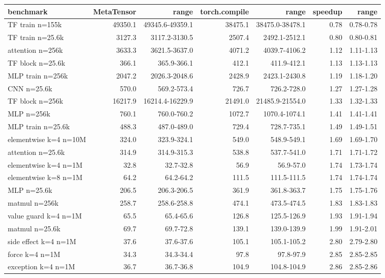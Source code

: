 \begin{tabular}{lrrrrrr}
\toprule
benchmark & MetaTensor & range & torch.compile & range & speedup & range \\
\midrule
TF train n=155k & 49350.1 & 49345.6-49359.1 & 38475.1 & 38475.0-38478.1 & 0.78 & 0.78-0.78 \\
TF train n=25.6k & 3127.3 & 3117.2-3130.5 & 2507.4 & 2492.1-2512.1 & 0.80 & 0.80-0.81 \\
attention n=256k & 3633.3 & 3621.5-3637.0 & 4071.2 & 4039.7-4106.2 & 1.12 & 1.11-1.13 \\
TF block n=25.6k & 366.1 & 365.9-366.1 & 412.1 & 411.9-412.1 & 1.13 & 1.13-1.13 \\
MLP train n=256k & 2047.2 & 2026.3-2048.6 & 2428.9 & 2423.1-2430.8 & 1.19 & 1.18-1.20 \\
CNN n=25.6k & 570.0 & 569.2-573.4 & 726.7 & 726.2-728.0 & 1.27 & 1.27-1.28 \\
TF block n=256k & 16217.9 & 16214.4-16229.9 & 21491.0 & 21485.9-21554.0 & 1.33 & 1.32-1.33 \\
MLP n=256k & 760.1 & 760.0-760.2 & 1072.7 & 1070.4-1074.1 & 1.41 & 1.41-1.41 \\
MLP train n=25.6k & 488.3 & 487.0-489.0 & 729.4 & 728.7-735.1 & 1.49 & 1.49-1.51 \\
elementwise k=4 n=10M & 324.0 & 323.9-324.1 & 549.0 & 548.9-549.1 & 1.69 & 1.69-1.70 \\
attention n=25.6k & 314.9 & 314.9-315.3 & 538.8 & 537.7-541.0 & 1.71 & 1.71-1.72 \\
elementwise k=4 n=1M & 32.8 & 32.7-32.8 & 56.9 & 56.9-57.0 & 1.74 & 1.73-1.74 \\
elementwise k=8 n=1M & 64.2 & 64.2-64.2 & 111.5 & 111.5-111.5 & 1.74 & 1.74-1.74 \\
MLP n=25.6k & 206.5 & 206.3-206.5 & 361.9 & 361.8-363.7 & 1.75 & 1.75-1.76 \\
matmul n=256k & 258.7 & 258.6-258.8 & 474.1 & 473.5-474.5 & 1.83 & 1.83-1.83 \\
value guard k=4 n=1M & 65.5 & 65.4-65.6 & 126.8 & 125.5-126.9 & 1.93 & 1.91-1.94 \\
matmul n=25.6k & 69.7 & 69.7-72.8 & 139.1 & 139.0-139.9 & 1.99 & 1.91-2.01 \\
side effect k=4 n=1M & 37.6 & 37.6-37.6 & 105.1 & 105.1-105.2 & 2.80 & 2.79-2.80 \\
force k=4 n=1M & 34.3 & 34.3-34.4 & 97.8 & 97.8-97.9 & 2.85 & 2.85-2.85 \\
exception k=4 n=1M & 36.7 & 36.7-36.8 & 104.9 & 104.8-104.9 & 2.86 & 2.85-2.86 \\

\end{tabular}
